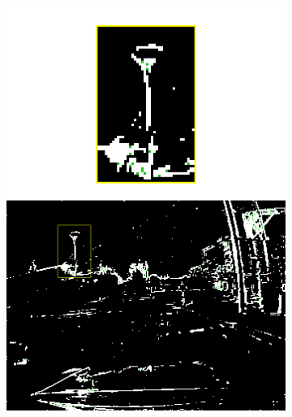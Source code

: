 \begin{figure}[t]
\begin{subfigure}{0.225\linewidth}
    \includegraphics[width=\linewidth]{mainmatter/figures/3_optical_flow/denoising_filling/denoised_filling_overlaid.png}
    \caption{}\label{subfig:ebof:denoising_filling:fill}
  \end{subfigure}
  \hspace{1mm}
  \begin{subfigure}{0.225\linewidth}
    \centering

\end{subfigure}
\end{figure}
